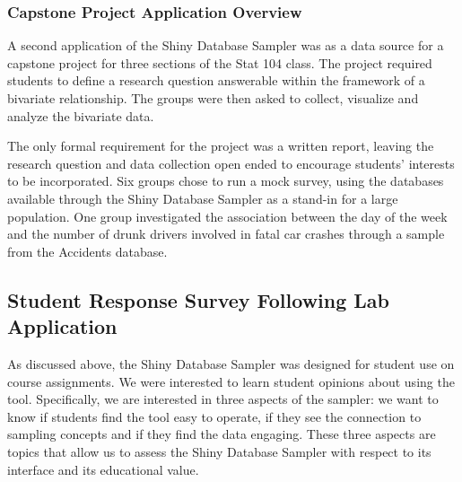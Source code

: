 \documentclass{article}\usepackage[]{graphicx}\usepackage[]{color}
\newcommand{\hh}[1]{{\color{ForestGreen} #1}}
\begin{document}
\subsubsection{Capstone Project Application Overview} 
\label{ProjectOverview} 

 
A second application of the Shiny Database Sampler was as a data source for a capstone project for three sections of the Stat 104 class.  The project required students to define a research question answerable within the framework of a bivariate relationship. The groups were then asked to collect, visualize and analyze the bivariate data. %

The only formal requirement for the project was a written report, leaving 
the research question and data collection open ended to encourage students' interests to be incorporated.  
Six groups chose to run a mock survey, using the databases available through the Shiny Database Sampler as a stand-in for a large population.  %
One group investigated  the association between the day of the week and the number of drunk drivers involved in fatal car crashes through a sample from the Accidents database.  \\ 


\subsection{Student Response Survey Following Lab Application}

As discussed above, the Shiny Database Sampler was designed for student use on course assignments. We were interested to learn student opinions about using the tool. Specifically, \hh{we are interested in three aspects of the sampler:} we want to know if students find the tool easy to operate, if they see the connection to sampling concepts and if they find the data engaging. 
These three aspects are topics that allow us to assess the Shiny Database Sampler with respect to its interface and its educational value.
\end{document}
